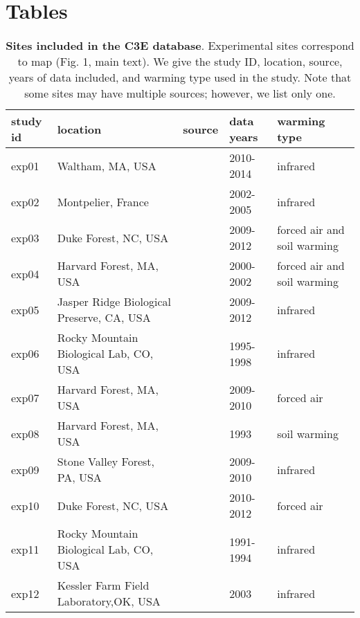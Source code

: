 \documentclass{article}
\begin{document}


\clearpage


\section* {Tables}

\begin{table}[b]
  \caption{{\bf Sites included in the C3E database}. Experimental sites
    correspond to map (Fig. 1, main text). We give the study ID, location, source, years of data included, and warming type used in the study. Note that some sites may have multiple sources; however, we list only one.}
\begin{footnotesize} 
   \begin{tabular}{| p{1.2cm} | p{5.7cm} | p{3.5cm} | p{1.5cm} | p{2cm} |}
    \hline
  study id & location & source & data years & warming type \\ \hline
    exp01 & Waltham, MA, USA & \cite{hoeppner2012} & 2010-2014 & infrared\\ \hline
    exp02 & Montpelier, France & \cite{morin2010} & 2002-2005 & infrared\\ \hline
    exp03 & Duke Forest, NC, USA & \cite{clark2014a} & 2009-2012 & forced air and soil warming\\ \hline
    exp04 & Harvard Forest, MA, USA & \cite{clark2014a} & 2000-2002 & forced air and soil warming\\ \hline
    exp05 & Jasper Ridge Biological Preserve, CA, USA & \cite{cleland2007} & 2009-2012 & infrared\\ \hline
    exp06 & Rocky Mountain Biological Lab, CO, USA & \cite{dunne2003} & 1995-1998 & infrared\\ \hline
    exp07 & Harvard Forest, MA, USA & \cite{pelini2011} & 2009-2010 & forced air \\ \hline
    exp08 & Harvard Forest, MA, USA & \cite{farnsworth1995} & 1993 & soil warming \\ \hline
    exp09 & Stone Valley Forest, PA, USA & \cite{rollinson2012} & 2009-2010 & infrared \\ \hline
    exp10 & Duke Forest, NC, USA & \cite{marchin2015} & 2010-2012 & forced air \\ \hline
    exp11 & Rocky Mountain Biological Lab, CO, USA & \cite{price1998} & 1991-1994 & infrared\\ \hline
    exp12 & Kessler Farm Field Laboratory,OK, USA & \cite{sherry2007} & 2003 & infrared\\ \hline
     \end{tabular}    
\end{footnotesize} 
    \end{table}
\clearpage
\end{document}
